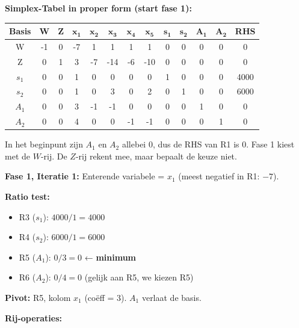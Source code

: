 \documentclass[a4paper,11pt]{article}
\begin{document}
\begin{oefenblok}
    \textbf{Simplex-Tabel in proper form (start fase 1):}

    \begin{center}
        \footnotesize
        \setlength{\tabcolsep}{3pt}
        \begin{tabular}{|c|c|c|c|c|c|c|c|c|c|c|c|c|}
            \hline
            \textbf{Basis} & \textbf{W} & \textbf{Z} & $\mathbf{x_1}$ & $\mathbf{x_2}$ & $\mathbf{x_3}$ & $\mathbf{x_4}$ & $\mathbf{x_5}$ & $\mathbf{s_1}$ & $\mathbf{s_2}$ & $\mathbf{A_1}$ & $\mathbf{A_2}$ & \textbf{RHS} \\
            \hline
            W & -1 & 0 & -7 & 1 & 1 & 1 & 1 & 0 & 0 & 0 & 0 & 0 \\
            \hline
            Z & 0 & 1 & 3 & -7 & -14 & -6 & -10 & 0 & 0 & 0 & 0 & 0 \\
            \hline
            $s_1$ & 0 & 0 & 1 & 0 & 0 & 0 & 0 & 1 & 0 & 0 & 0 & 4000 \\
            \hline
            $s_2$ & 0 & 0 & 1 & 0 & 3 & 0 & 2 & 0 & 1 & 0 & 0 & 6000 \\
            \hline
            $A_1$ & 0 & 0 & 3 & -1 & -1 & 0 & 0 & 0 & 0 & 1 & 0 & 0 \\
            \hline
            $A_2$ & 0 & 0 & 4 & 0 & 0 & -1 & -1 & 0 & 0 & 0 & 1 & 0 \\
            \hline
        \end{tabular}
    \end{center}

    In het beginpunt zijn $A_1$ en $A_2$ allebei 0, dus de RHS van R1 is 0. Fase 1 kiest met de $W$-rij. De $Z$-rij rekent mee, maar bepaalt de keuze niet.

    \textbf{Fase 1, Iteratie 1:} Enterende variabele = $x_1$ (meest negatief in R1: $-7$).

    \textbf{Ratio test:}
    \begin{itemize}
        \item R3 ($s_1$): $4000/1 = 4000$
        \item R4 ($s_2$): $6000/1 = 6000$
        \item R5 ($A_1$): $0/3 = 0$ ← \textbf{minimum}
        \item R6 ($A_2$): $0/4 = 0$ (gelijk aan R5, we kiezen R5)
    \end{itemize}

    \textbf{Pivot:} R5, kolom $x_1$ (coëff = 3). $A_1$ verlaat de basis.

    \textbf{Rij-operaties:}


\end{oefenblok}
\end{document}
